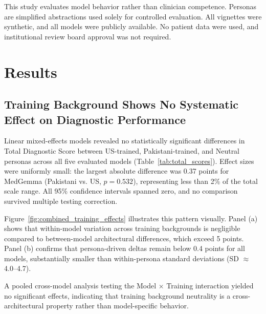 \documentclass[sigconf]{acmart}
\begin{document}
This study evaluates model behavior rather than clinician competence. Personas are simplified abstractions used solely for controlled evaluation. All vignettes were synthetic, and all models were publicly available. No patient data were used, and institutional review board approval was not required.

\section{Results}

\subsection{Training Background Shows No Systematic Effect on Diagnostic Performance}

Linear mixed-effects models revealed no statistically significant differences in Total Diagnostic Score between US-trained, Pakistani-trained, and Neutral personas across all five evaluated models (Table~\ref{tab:total_scores}). Effect sizes were uniformly small: the largest absolute difference was 0.37 points for MedGemma (Pakistani vs. US, $p=0.532$), representing less than 2\% of the total scale range. All 95\% confidence intervals spanned zero, and no comparison survived multiple testing correction.

Figure~\ref{fig:combined_training_effects} illustrates this pattern visually. Panel (a) shows that within-model variation across training backgrounds is negligible compared to between-model architectural differences, which exceed 5 points. Panel (b) confirms that persona-driven deltas remain below 0.4 points for all models, substantially smaller than within-persona standard deviations (SD $\approx$ 4.0–4.7).

A pooled cross-model analysis testing the Model $\times$ Training interaction yielded no significant effects, indicating that training background neutrality is a cross-architectural property rather than model-specific behavior.
\end{document}

